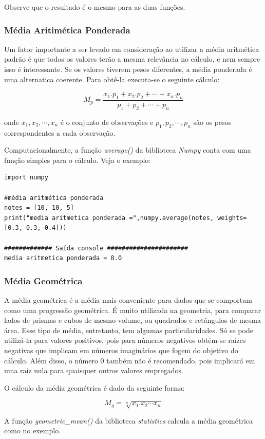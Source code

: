 \documentclass{article}
\begin{document}
Observe que o resultado é o mesmo para as duas funções. 

\subsubsection{Média Aritimética Ponderada}
Um fator importante a ser levado em consideração ao utilizar a média aritmética padrão é que todos os valores terão a mesma relevância no cálculo, e nem sempre isso é interessante. Se os valores tiverem pesos diferentes, a média ponderada é uma alternatica coerente. Para obtê-la executa-se o seguinte cálculo:

$$M_p = \frac{x_1 . p_1 + x_2 . p_2 + \cdots + x_n . p_n}{p_1 + p_2 + \cdots + p_n}$$

onde $x_1, x_2, \cdots, x_n$ é o conjunto de observações e $p_1, p_2, \cdots, p_n$ são os pesos correspondentes a cada observação.

Computacionalmente, a função {\it average()} da biblioteca {\it Numpy} conta com uma função simples para o cálculo. Veja o exemplo:

\begin{verbatim}
import numpy

#média aritmética ponderada
notes = [10, 10, 5]
print("media aritmetica ponderada =",numpy.average(notes, weights=[0.3, 0.3, 0.4]))

############# Saída console ######################
media aritmetica ponderada = 8.0
\end{verbatim}

\subsubsection{Média Geométrica}
A média geométrica é a média mais conveniente para dados que se comportam como uma progressão geométrica. É muito utilizada na geometria, para comparar lados de prismas e cubos de mesmo volume, ou quadrados e retângulos de mesma área. Esse tipo de média, entretanto, tem algumas particularidades. Só se pode utilizá-la para valores positivos, pois para números negativos obtém-se raízes negativas que implicam em números imaginários que fogem do objetivo do cálculo. Além  disso, o número 0 também não é recomendado, pois implicará em uma raiz nula para quaisquer outros valores empregados.

O cálculo da média geométrica é dado da seguinte forma:

$$M_g = \sqrt[n]{x_1 . x_2 \cdots x_n} $$

A função {\it geometric\_mean()} da biblioteca {\it statistics} calcula a média geométrica como no exemplo.
\end{document}
